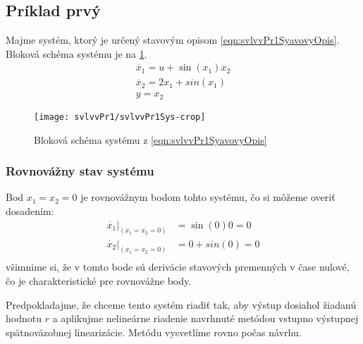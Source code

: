 \documentclass[../main.tex]{subfiles}
\begin{document}
    \subsection{Príklad prvý}
	    Majme systém, ktorý je určený stavovým opisom \cref{eqn:svlvvPr1SyavovyOpis}. Bloková schéma systému je na \cref{fig:svlvvPr1BlockSchemaSystemu}.
	\begin{equation}
		\begin{gathered}
		\dot{x_1}  =u + \sin(x_1) x_2 \\
		\dot{x_2} = 2x_1 + sin(x_1) \\
		y = x_2
		\end{gathered}
		\label{eqn:svlvvPr1SyavovyOpis}
	\end{equation}
	\begin{figure}[h!]
		\centering
		\texttt{[image: svlvvPr1/svlvvPr1Sys-crop]}
		\caption{Bloková schéma systému z \cref{eqn:svlvvPr1SyavovyOpis}}
		\label{fig:svlvvPr1BlockSchemaSystemu}
	\end{figure}
    \subsubsection{Rovnovážny stav systému}
    Bod $x_1 = x_2 = 0$ je rovnovážnym bodom tohto systému, čo si môžeme overiť dosadením:
	\begin{equation*}
	    \begin{aligned}
            \dot{x_1}|_{(x_1 = x_2 = 0)} &= \sin(0) 0 = 0 \\
            \dot{x_2}|_{(x_1 = x_2 = 0)}  &= 0 + sin(0) = 0 \\
	    \end{aligned}
	    \label{eqn:svlvvPr1OverenieRB}
	\end{equation*}
	všimnime si, že v tomto bode sú derivácie stavových premenných v čase nulové, čo je charakteristické pre rovnovážne body.
	
	Predpokladajme, že chceme tento systém riadiť tak, aby výstup dosiahol žiadanú hodnotu $r$ a aplikujme nelineárne riadenie navrhnuté metódou vstupno výstupnej spätnoväzobnej linearizácie. Metódu vysvetlíme rovno počas návrhu. 
	
\end{document}
